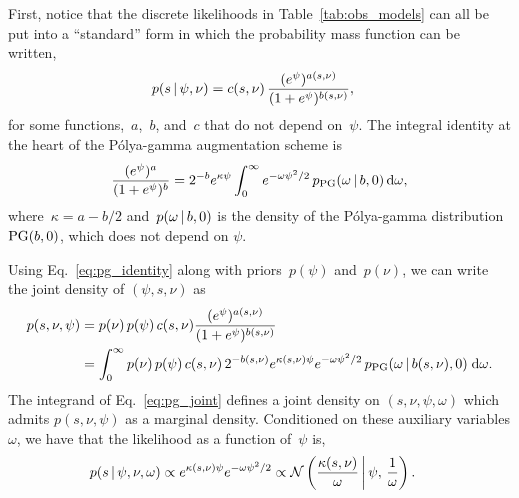 First, notice that the discrete likelihoods in Table~\ref{tab:obs_models}
can all be put into  a ``standard'' form in which the probability
mass function can be written,
\begin{align}
  p(s \,|\, \psi, \nu) &= c(s, \nu) \, \frac{(e^\psi)^{a(s, \nu)}}{(1+e^\psi)^{b(s, \nu)}},
\end{align}
for some functions,~$a$,~$b$, and~$c$ that do not depend on~$\psi$.
The integral identity at the heart of the P\'{o}lya-gamma augmentation scheme  is
\begin{align}
\label{eq:pg_identity}
\frac{(e^{\psi})^a}{(1+e^{\psi})^b} = 2^{-b} e^{\kappa \psi} \int_{0}^{\infty} e^{-\omega \psi^2 /2} \, p_{\mathrm{PG}}(\omega \,|\, b, 0) \, \mathrm{d}\omega,
\end{align}
where~${\kappa=a-b/2}$ and~$p(\omega\,|\, b, 0)$ is the density of the P\'{o}lya-gamma
distribution~${\mathrm{PG}(b, 0)}$, which does not depend on $\psi$.

Using Eq.~\ref{eq:pg_identity} along with priors~$p(\psi)$ and~$p(\nu)$, we can write the joint density of $(\psi, s, \nu)$ as
\begin{align}
  \label{eq:pg_joint}
  p(s, \nu, \psi)
  &= p(\nu) \, p(\psi) \, c(s, \nu) \frac{(e^\psi)^{a(s, \nu)}}{(1+e^\psi)^{b(s, \nu)}} \\
  &= \int_0^\infty
  p(\nu) \, p(\psi) \, c(s, \nu) \, 2^{-b(s, \nu)} e^{\kappa(s, \nu) \psi} e^{-\omega \psi^2/2} \, p_{\mathrm{PG}}(\omega \,|\, b(s, \nu), 0) \; \mathrm{d}\omega.
\end{align}
The integrand of Eq.~\ref{eq:pg_joint} defines a joint density on $(s, \nu, \psi, \omega)$ which admits $p(s, \nu, \psi)$ as a marginal density.
Conditioned on these auxiliary variables $\omega$, we have that the likelihood as a function of~$\psi$ is,
\begin{align}
  p(s \,|\, \psi, \nu, \omega)
  &\propto e^{\kappa(s, \nu) \psi} e^{- \omega \psi^2/2} 
\propto \mathcal{N} \left(\frac{\kappa(s, \nu)}{\omega} \, \bigg| \, \psi, \, \frac{1}{\omega} \right).
\end{align}

